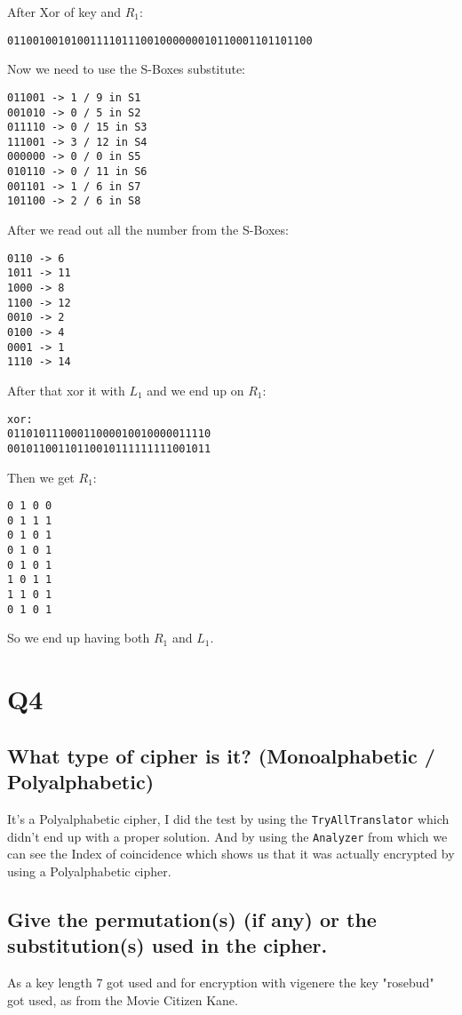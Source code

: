 \documentclass{article}
\begin{document}
After Xor of key and $R_1$:

\begin{verbatim}
011001001010011110111001000000010110001101101100
\end{verbatim}

Now we need to use the S-Boxes substitute:



\begin{verbatim}
011001 -> 1 / 9 in S1
001010 -> 0 / 5 in S2
011110 -> 0 / 15 in S3
111001 -> 3 / 12 in S4
000000 -> 0 / 0 in S5
010110 -> 0 / 11 in S6
001101 -> 1 / 6 in S7
101100 -> 2 / 6 in S8
\end{verbatim}

After we read out all the number from the S-Boxes:

\begin{verbatim}
0110 -> 6
1011 -> 11
1000 -> 8
1100 -> 12
0010 -> 2
0100 -> 4
0001 -> 1
1110 -> 14
\end{verbatim}

After that xor it with $L_1$ and we end up on $R_1$:
\begin{verbatim}
xor:
01101011100011000010010000011110
00101100110110010111111111001011
\end{verbatim}


Then we get $R_1$:

\begin{verbatim}
0 1 0 0
0 1 1 1
0 1 0 1
0 1 0 1
0 1 0 1
1 0 1 1
1 1 0 1
0 1 0 1
\end{verbatim}

So we end up having both $R_1$ and $L_1$.

\section{Q4}

\subsection{What type of cipher is it? (Monoalphabetic / Polyalphabetic)}
It's a Polyalphabetic cipher, I did the test by using the \texttt{TryAllTranslator} which didn't end up with a proper solution.
And by using the \texttt{Analyzer} from which we can see the Index of coincidence which shows us that it was actually encrypted by using a Polyalphabetic cipher.

\subsection{Give the permutation(s) (if any) or the substitution(s) used in the cipher.}
As a key length 7 got used and for encryption with vigenere the key "rosebud" got used, as from the Movie Citizen Kane.
\end{document}
